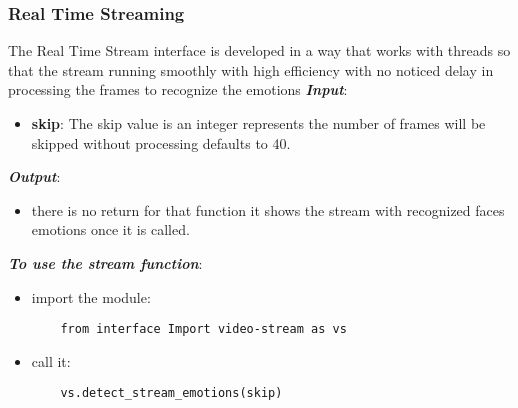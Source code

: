 \subsubsection{Real Time Streaming}
The Real Time Stream interface is developed in a way that works with threads so that the stream running smoothly with high efficiency with no noticed delay in processing the frames to recognize the emotions 
\bigbreak 
\noindent\textbf{\textit{Input}}:
\begin{itemize}
	\item \textbf{skip}:\newline
	The skip value is an integer represents the number of frames will be skipped without processing defaults to 40.
\end{itemize}
\noindent\textbf{\textit{Output}}:
\begin{itemize}
	\item there is no return for that function it shows the stream with recognized faces emotions once it is called.
\end{itemize}
\noindent\textbf{\textit{To use the stream function}}:
\begin{itemize}
	\item import the module:
	\begin{verbatim}
	from interface Import video-stream as vs
	\end{verbatim}
	\item call it:
	\begin{verbatim}
	vs.detect_stream_emotions(skip)
	\end{verbatim}
\end{itemize}


